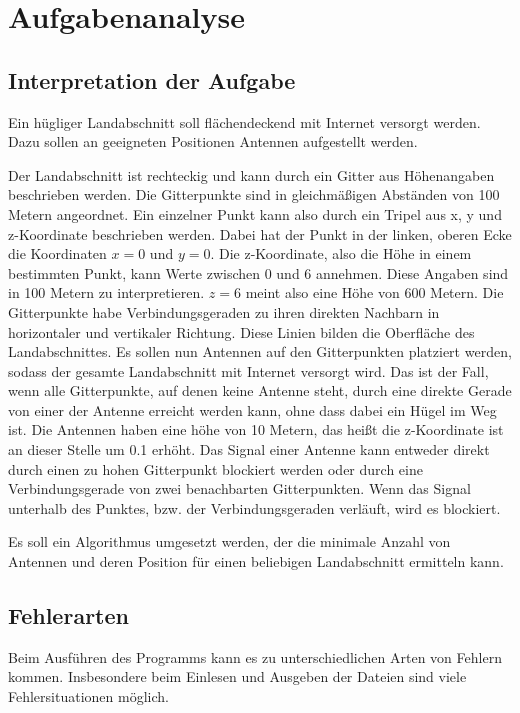 \chapter{Aufgabenanalyse}\label{ch:aufgabenanalyse}


\section{Interpretation der Aufgabe}\label{sec:interpretation-der-aufgabe}

Ein hügliger Landabschnitt soll flächendeckend mit Internet versorgt werden.
Dazu sollen an geeigneten Positionen Antennen aufgestellt werden.

Der Landabschnitt ist rechteckig und kann durch ein Gitter aus Höhenangaben beschrieben werden.
Die Gitterpunkte sind in gleichmäßigen Abständen von 100 Metern angeordnet.
Ein einzelner Punkt kann also durch ein Tripel aus x, y und z-Koordinate beschrieben werden.
Dabei hat der Punkt in der linken, oberen Ecke die Koordinaten $x = 0$ und $y = 0$.
Die z-Koordinate, also die Höhe in einem bestimmten Punkt, kann Werte zwischen $0$ und $6$ annehmen.
Diese Angaben sind in 100 Metern zu interpretieren.
$z=6$ meint also eine Höhe von 600 Metern.
Die Gitterpunkte habe Verbindungsgeraden zu ihren direkten Nachbarn in horizontaler und vertikaler Richtung.
Diese Linien bilden die Oberfläche des Landabschnittes.
Es sollen nun Antennen auf den Gitterpunkten platziert werden, sodass der gesamte Landabschnitt mit Internet versorgt wird.
Das ist der Fall, wenn alle Gitterpunkte, auf denen keine Antenne steht, durch eine direkte Gerade von einer der Antenne erreicht werden kann, ohne dass dabei ein Hügel im Weg ist.
Die Antennen haben eine höhe von 10 Metern, das heißt die z-Koordinate ist an dieser Stelle um 0.1 erhöht.
Das Signal einer Antenne kann entweder direkt durch einen zu hohen Gitterpunkt blockiert werden oder durch eine Verbindungsgerade von zwei benachbarten Gitterpunkten.
Wenn das Signal unterhalb des Punktes, bzw. der Verbindungsgeraden verläuft, wird es blockiert.

Es soll ein Algorithmus umgesetzt werden, der die minimale Anzahl von Antennen und deren Position für einen beliebigen Landabschnitt ermitteln kann.

\section{Fehlerarten}\label{sec:fehlerarten}

Beim Ausführen des Programms kann es zu unterschiedlichen Arten von Fehlern kommen.
Insbesondere beim Einlesen und Ausgeben der Dateien sind viele Fehlersituationen möglich.

